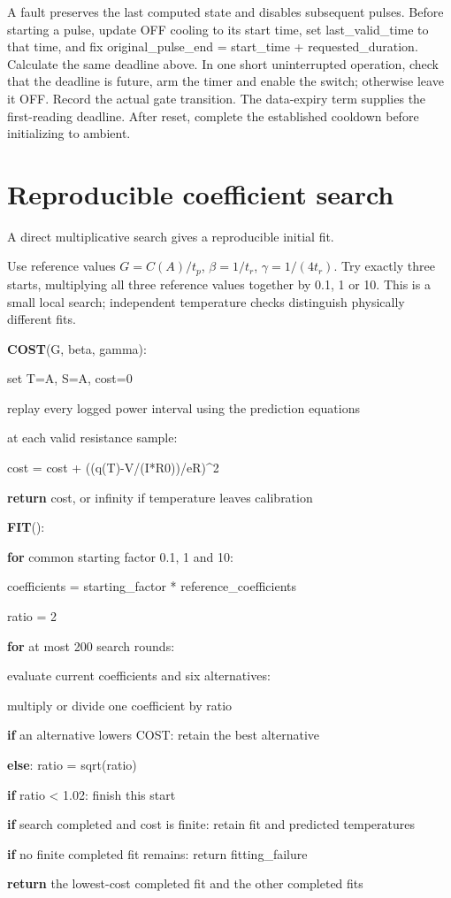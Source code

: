 \documentclass[11pt,letterpaper]{article}
\newenvironment{pseudocode}{\par\begingroup\small\setlength{\parskip}{0.15em}}{\endgroup\par}
\newcommand{\pcstep}[2]{\par\noindent\hspace*{#1em}\parbox[t]{\dimexpr\linewidth-#1em\relax}{\raggedright #2\strut}}
\begin{document}
A fault preserves the last computed state and disables subsequent pulses. Before starting a pulse, update OFF cooling to its start time, set \textsf{last\_\allowbreak{}valid\_\allowbreak{}time} to that time, and fix \textsf{original\_\allowbreak{}pulse\_\allowbreak{}end = start\_\allowbreak{}time + requested\_\allowbreak{}duration}. Calculate the same deadline above. In one short uninterrupted operation, check that the deadline is future, arm the timer and enable the switch; otherwise leave it OFF. Record the actual gate transition. The data-expiry term supplies the first-reading deadline. After reset, complete the established cooldown before initializing to ambient.

\section{Reproducible coefficient search}

A direct multiplicative search gives a reproducible initial fit.

Use reference values \(G=C(A)/t_p\), \(\beta=1/t_r\), \(\gamma=1/(4t_r)\). Try exactly three starts, multiplying all three reference values together by 0.1, 1 or 10. This is a small local search; independent temperature checks distinguish physically different fits.

\begin{pseudocode}
\pcstep{0.0}{\textbf{COST}(G, beta, gamma):}
\pcstep{1.0}{set T=A, S=A, cost=0}
\pcstep{1.0}{replay every logged power interval using the prediction equations}
\pcstep{1.0}{at each valid resistance sample:}
\pcstep{2.0}{cost = cost + ((q(T)-V/(I*R0))/eR)\textasciicircum{}2}
\pcstep{1.0}{\textbf{return} cost, or infinity if temperature leaves calibration}
\par\vspace{0.35em}
\pcstep{0.0}{\textbf{FIT}():}
\pcstep{1.0}{\textbf{for} common starting factor 0.1, 1 and 10:}
\pcstep{2.0}{coefficients = starting\_\allowbreak{}factor * reference\_\allowbreak{}coefficients}
\pcstep{2.0}{ratio = 2}
\pcstep{2.0}{\textbf{for} at most 200 search rounds:}
\pcstep{3.0}{evaluate current coefficients and six alternatives:}
\pcstep{4.0}{multiply or divide one coefficient by ratio}
\pcstep{3.0}{\textbf{if} an alternative lowers COST: retain the best alternative}
\pcstep{3.0}{\textbf{else}: ratio = sqrt(ratio)}
\pcstep{3.0}{\textbf{if} ratio < 1.02: finish this start}
\pcstep{2.0}{\textbf{if} search completed and cost is finite: retain fit and predicted temperatures}
\pcstep{1.0}{\textbf{if} no finite completed fit remains: return fitting\_\allowbreak{}failure}
\pcstep{1.0}{\textbf{return} the lowest-cost completed fit and the other completed fits}
\end{pseudocode}
\end{document}
